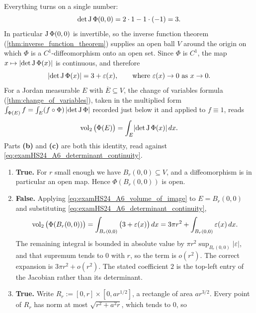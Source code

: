 \begin{exercisesolution}
\label{sol:image_of_small_sets_tf}
Everything turns on a single number:
\[\det\operatorname{J}\Phi(0,0) = 2\cdot 1 - 1\cdot(-1) = 3 .\]
In particular $\operatorname{J}\Phi(0,0)$ is invertible, so the inverse function theorem
(\cref{thm:inverse_function_theorem}) supplies an open ball $V$ around the origin on which $\Phi$
is a $C^1$-diffeomorphism onto an open set. Since $\Phi$ is $C^1$, the map
$x \mapsto \lvert\det\operatorname{J}\Phi(x)\rvert$ is continuous, and therefore
\begin{equation}
\label{eq:examHS24_A6_determinant_continuity}
\lvert\det\operatorname{J}\Phi(x)\rvert = 3 + \varepsilon(x), \qquad \text{where } \varepsilon(x) \to 0
\text{ as } x \to 0 .
\end{equation}
For a Jordan measurable $E$ with $\overline{E} \subseteq V$, the change of variables formula
(\cref{thm:change_of_variables}), taken in the multiplied form $\int_{\Phi(E)} f = \int_E
(f\circ\Phi)\,\lvert\det\operatorname{J}\Phi\rvert$ recorded just below it and applied to $f \equiv 1$, reads
\begin{equation}
\label{eq:examHS24_A6_volume_of_image}
\operatorname{vol}_2\big(\Phi(E)\big) = \int_E \lvert\det\operatorname{J}\Phi(x)\rvert \, dx .
\end{equation}
Parts \textbf{(b)} and \textbf{(c)} are both this identity, read against
\eqref{eq:examHS24_A6_determinant_continuity}.
\begin{enumerate}[label=\textbf{(\alph*)}]
  \item \textbf{True.} For $r$ small enough we have $B_r(0,0) \subseteq V$, and a diffeomorphism is
    in particular an open map. Hence $\Phi(B_r(0,0))$ is open.
  \item \textbf{False.} Applying \eqref{eq:examHS24_A6_volume_of_image} to $E = B_r(0,0)$ and
    substituting \eqref{eq:examHS24_A6_determinant_continuity},
    \[\operatorname{vol}_2\big(\Phi(B_r(0,0))\big) = \int_{B_r(0,0)} \big(3 + \varepsilon(x)\big)\,dx
      = 3\pi r^2 + \int_{B_r(0,0)} \varepsilon(x)\,dx .\]
    The remaining integral is bounded in absolute value by $\pi r^2 \sup_{B_r(0,0)}
    \lvert\varepsilon\rvert$, and that supremum tends to $0$ with $r$, so the term is $o(r^2)$. The
    correct expansion is $3\pi r^2 + o(r^2)$. The stated coefficient $2$ is the top-left entry of
    the Jacobian rather than its determinant.
  \item \textbf{True.} Write $R_r := [0,r] \times [0, ar^{1/2}]$, a rectangle of area $ar^{3/2}$.
    Every point of $R_r$ has norm at most $\sqrt{r^2 + a^2 r}$, which tends to $0$, so

\end{enumerate}
\end{exercisesolution}
